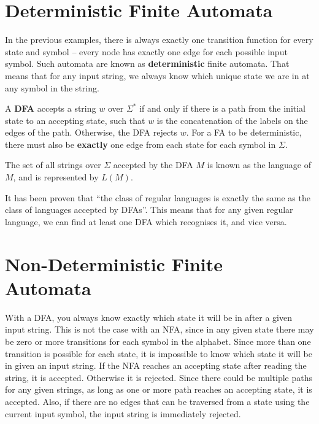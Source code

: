 \section*{Deterministic Finite Automata}

In the previous examples, there is always exactly one transition function for every state and symbol -- every node has
 exactly one edge for each possible input symbol. Such automata are known as \textbf{deterministic} finite automata.
 That means that for any input string, we always know which unique state we are in at any symbol in the string.

\begin{definition*}{}{}
  A \textbf{DFA} accepts a string $w$ over $\Sigma^*$ if and only if there is a path from the initial state to an
   accepting state, such that $w$ is the concatenation of the labels on the edges of the path. Otherwise, the DFA
   rejects $w$. For a FA to be deterministic, there must also be \textbf{exactly} one edge from each state for each
   symbol in $\Sigma$.

  The set of all strings over $\Sigma$ accepted by the DFA $M$ is known as the language of $M$, and is represented by
   $L(M)$.
\end{definition*}

It has been proven that ``the class of regular languages is exactly the same as the class of languages accepted by DFAs''.
 This means that for any given regular language, we can find at least one DFA which recognises it, and vice versa.

\section*{Non-Deterministic Finite Automata}

With a DFA, you always know exactly which state it will be in after a given input string. This is not the case with an
 NFA, since in any given state there may be zero or more transitions for each symbol in the alphabet. Since more than
 one transition is possible for each state, it is impossible to know which state it will be in given an input string.
 If the NFA reaches an accepting state after reading the string, it is accepted. Otherwise it is rejected. Since there
 could be multiple paths for any given strings, as long as one or more path reaches an accepting state, it is accepted.
 Also, if there are no edges that can be traversed from a state using the current input symbol, the input string is
 immediately rejected.

